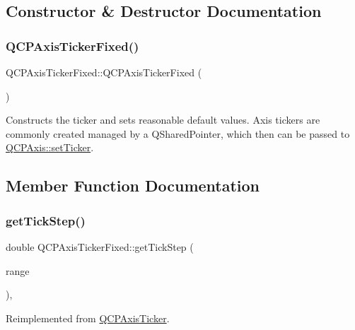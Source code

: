 \subsection{Constructor \& Destructor Documentation}
\mbox{\label{class_q_c_p_axis_ticker_fixed_a96d2b053a15f9b8e94550c3efeff6a34}} 
\subsubsection{\texorpdfstring{QCPAxisTickerFixed()}{QCPAxisTickerFixed()}}
{\footnotesize\ttfamily Q\+C\+P\+Axis\+Ticker\+Fixed\+::\+Q\+C\+P\+Axis\+Ticker\+Fixed (\begin{DoxyParamCaption}{ }\end{DoxyParamCaption})}

Constructs the ticker and sets reasonable default values. Axis tickers are commonly created managed by a Q\+Shared\+Pointer, which then can be passed to \mbox{\hyperlink{class_q_c_p_axis_a4ee03fcd2c74d05cd1a419b9af5cfbdc}{Q\+C\+P\+Axis\+::set\+Ticker}}. 

\subsection{Member Function Documentation}
\mbox{\label{class_q_c_p_axis_ticker_fixed_a9e99da01ab92a86aed415eef32fed13a}} 
\subsubsection{\texorpdfstring{getTickStep()}{getTickStep()}}
{\footnotesize\ttfamily double Q\+C\+P\+Axis\+Ticker\+Fixed\+::get\+Tick\+Step (\begin{DoxyParamCaption}\item[{const \mbox{\hyperlink{class_q_c_p_range}{Q\+C\+P\+Range}} \&}]{range }\end{DoxyParamCaption})\hspace{0.3cm}{\ttfamily [protected]}, {\ttfamily [virtual]}}



Reimplemented from \mbox{\hyperlink{class_q_c_p_axis_ticker_a910d69bcec2de37e92d8d4e1ecf201e2}{Q\+C\+P\+Axis\+Ticker}}.

